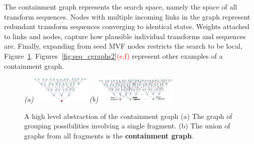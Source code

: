 \noindent
The containment graph represents the search space, namely the space of all transform sequences. Nodes with multiple incoming links in the graph represent redundant transform sequences converging to identical states. Weights attached to links and nodes, capture how plausible individual transforms and sequences are. Finally, expanding from seed MVF nodes restricts the search to be local, Figure~\ref{fig:cgraph_abstract}. Figures~\ref{fig:seq_cgraphs2}\textcolor{red}{(e,f)} represent other examples of a containment graph. 


\begin{figure}[ht]
\centering
{\footnotesize\textit{(a)}}\includegraphics[width=0.25\textwidth]{figs/hypothesis-tree.jpg}
{\footnotesize\textit{(b)}}\includegraphics[width=0.35\textwidth]{figs/merged-hypothesis-trees.jpg}
\caption{A high level abstraction of the containment graph (a) The graph of grouping possibilities involving a single fragment. (b) The union of  graphs  from all fragments is the   {\bf containment graph}.}
\label{fig:cgraph_abstract}
\end{figure}

